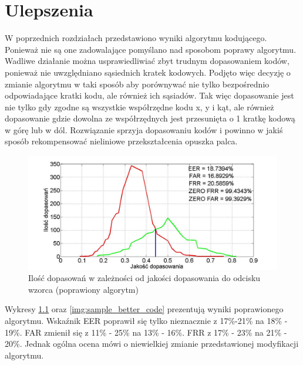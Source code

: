 \chapter{Ulepszenia}

W poprzednich rozdziałach przedstawiono wyniki algorytmu kodującego. Ponieważ nie są one zadowalające pomyślano nad sposobom poprawy algorytmu. Wadliwe działanie można usprawiedliwiać zbyt trudnym dopasowaniem kodów, ponieważ nie uwzględniano sąsiednich kratek kodowych. Podjęto więc decyzję o zmianie algorytmu w taki sposób aby porównywać nie tylko bezpośrednio odpowiadające kratki kodu, ale również ich sąsiadów. Tak więc dopasowanie jest nie tylko gdy zgodne są wszystkie współrzędne kodu x, y i kąt, ale również dopasowanie gdzie dowolna ze współrzędnych jest przesunięta o 1 kratkę kodową w górę lub w dól. Rozwiązanie sprzyja dopasowaniu kodów i powinno w jakiś sposób rekompensować nieliniowe przekształcenia opuszka palca. 
\begin{figure}[!htb]
    \begin{center}
		\includegraphics[angle=0,scale=0.35]{img/pattern_line_statistic_better_code.jpg}
		\caption{Ilość dopasowań w zależności od jakości dopasowania do odcisku wzorca (poprawiony algorytm)}
		\label{img:pattern_better_code}
    \end{center}
\end{figure} 

Wykresy \ref{img:pattern_better_code} oraz \ref{img:sample_better_code} prezentują wyniki poprawionego algorytmu. Wskaźnik EER poprawił się tylko nieznacznie z 17\%-21\% na 18\% - 19\%. FAR zmienił się z 11\% - 25\% na 13\% - 16\%. FRR z 17\% - 23\% na 21\% - 20\%. Jednak ogólna ocena mówi o niewielkiej zmianie przedstawionej modyfikacji algorytmu.

